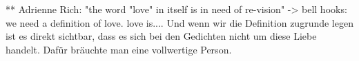   ** Adrienne Rich: "the word "love" in itself is in need of re-vision"
  -> bell hooks: we need a definition of love.
  love is....
  Und wenn wir die Definition zugrunde legen ist es direkt sichtbar, dass es sich bei den Gedichten nicht um diese Liebe handelt.
  Dafür bräuchte man eine vollwertige Person.

\begin{comment}
    [Kolodny1980]

"What makes it so exciting, of course, is
that it can be constantly relearned and refined, so as to provide
either an individual or an entire reading community, over time,
with infinite variations of the same text. It can provide that, but,
I must add, too often it does not"
Quote Komilitonin mit: "universell menschliches fleischliches Begehren" -> und argue that we need critical feminist thinking education in order to shift perspectives in such readings.
Fast der ganze Kurs mit Ausnahme der Professorin und ein paar Studentinnen, die über das Durschnittsalter von 22 waren, scheinten mit der Leseweise kein Problem zu haben.
Ich frage mich was die selbe Person heute darüber sagen würde, wenn sie die Gedichte nochmal liest.

    [Kolodny1980]

auch
"these critics also insist upon exam-
ining not only the mirroring of life in art, but also the normative
impact of art on life."
\end{comment}

